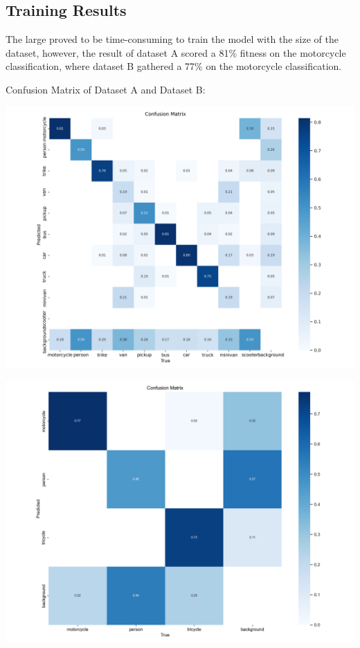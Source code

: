 \documentclass[a0,portrait]{a0poster}
\begin{document}
\begin{multicols}{2}
		\subsection*{Training Results}
			The large proved to be time-consuming to train the model with the size of the dataset, however, the result of dataset A scored a 81\% fitness on the motorcycle classification, where dataset B gathered a 77\% on the motorcycle classification.

			Confusion Matrix of Dataset A and Dataset B:
			\begin{center}\vspace{1cm}
				\begin{minipage}{0.2\textwidth}
					\centering
					\includegraphics[width=\textwidth]{a_confusion_matrix.png}
					\label{fig:dAConfusionMatrix}
				\end{minipage}\hfill
				\begin{minipage}{0.2\textwidth}
					\includegraphics[width=\textwidth]{b_confusion_matrix.png}
					\label{fig:dBConfusionMatrix}
				\end{minipage}\vspace{1cm}
			\end{center}\vspace{1cm}


\end{multicols}
\end{document}
